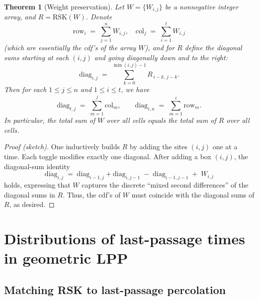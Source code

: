 \documentclass[letterpaper,11pt,oneside,reqno]{book}
\numberwithin{equation}{chapter}  %
\newtheorem{theorem}[proposition]{Theorem}
\theoremstyle{definition}
\begin{document}
\begin{theorem}[Weight preservation]
\label{lecture14:thm:WeightPreservationRecap}
Let $W=\{W_{i,j}\}$ be a nonnegative integer array, and $R=\mathrm{RSK}(W)$.  Denote
\[
\mathrm{row}_i \;=\; \sum_{j=1}^{n} W_{i,j},
\quad
\mathrm{col}_j \;=\; \sum_{i=1}^{t} W_{i,j}
\]
(which are essentially the cdf's of the array $W$\/),
and for $R$ define the diagonal sums starting at each $(i,j)$ and going diagonally down and to the right:
\[
\mathrm{diag}_{i,j}
\;=\;
\sum_{k=0}^{\min(i,j)-1} R_{\,i-k,\,j-k}.
\]
Then for each $1\le j\le n$ and $1\le i\le t$, we have
\begin{equation}
\label{lecture14:eq:diagIdentityRecap}
\mathrm{diag}_{t,j}
\;=\;
\sum_{m=1}^{j}\mathrm{col}_{m},
\qquad
\mathrm{diag}_{i,n}
\;=\;
\sum_{m=1}^{i}\mathrm{row}_{m}.
\end{equation}
In particular,
the total sum of $W$ over all cells equals the total sum of $R$ over all cells.
\end{theorem}

\begin{proof}[Proof (sketch)]
	One inductively builds $R$ by adding the sites $(i,j)$ one at a time.  Each toggle modifies exactly one diagonal.
	After adding a box $(i,j)$, the diagonal-sum identity
\[
\mathrm{diag}_{i,j}
\;=\;
\mathrm{diag}_{i-1,j} + \mathrm{diag}_{i,j-1}
\;-\;
\mathrm{diag}_{i-1,j-1}
\;+\;
W_{i,j}
\]
holds, expressing that $W$ captures the discrete ``mixed second differences'' of the diagonal sums in $R$.
Thus, the cdf's of $W$ must coincide with the diagonal sums of $R$, as desired.
\end{proof}

\section{Distributions of last-passage times in geometric LPP}
\label{lecture14:sec:distributions_geometric_LPP}

\subsection{Matching RSK to last-passage percolation}
\end{document}
